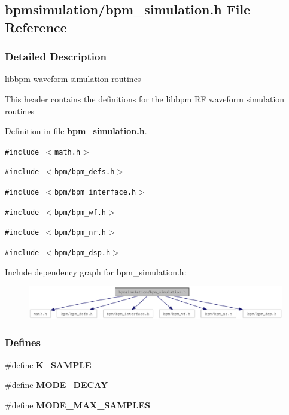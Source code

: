 \subsection{bpmsimulation/bpm\_\-simulation.h File Reference}
\label{bpm__simulation_8h}


\subsubsection{Detailed Description}
libbpm waveform simulation routines 

This header contains the definitions for the libbpm RF waveform simulation routines 

Definition in file {\bf bpm\_\-simulation.h}.

{\tt \#include $<$math.h$>$}\par
{\tt \#include $<$bpm/bpm\_\-defs.h$>$}\par
{\tt \#include $<$bpm/bpm\_\-interface.h$>$}\par
{\tt \#include $<$bpm/bpm\_\-wf.h$>$}\par
{\tt \#include $<$bpm/bpm\_\-nr.h$>$}\par
{\tt \#include $<$bpm/bpm\_\-dsp.h$>$}\par


Include dependency graph for bpm\_\-simulation.h:\nopagebreak
\begin{figure}[H]
\begin{center}
\leavevmode
\includegraphics[width=358pt]{bpm__simulation_8h__incl}
\end{center}
\end{figure}
\subsubsection*{Defines}
\begin{CompactItemize}
\item 
\#define {\bf K\_\-SAMPLE}
\item 
\#define \textbf{MODE\_\-DECAY}\label{group__sim_g057113600a8f0d237093da56f7c6b490}

\item 
\#define \textbf{MODE\_\-MAX\_\-SAMPLES}\label{group__sim_g26762c236ebdbdf60197a9aa519bf6aa}

\end{CompactItemize}
